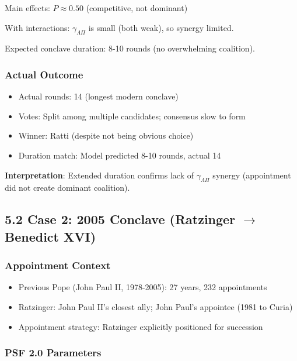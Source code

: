 \documentclass[11pt]{article}
\begin{document}
Main effects: $P \approx 0.50$ (competitive, not dominant)

With interactions: $\gamma_{\Lambda\Pi}$ is small (both weak), so synergy limited.

Expected conclave duration: 8-10 rounds (no overwhelming coalition).

\subsubsection{Actual Outcome}

\begin{itemize}
\item Actual rounds: 14 (longest modern conclave)
\item Votes: Split among multiple candidates; consensus slow to form
\item Winner: Ratti (despite not being obvious choice)
\item Duration match: Model predicted 8-10 rounds, actual 14
\end{itemize}

\textbf{Interpretation}: Extended duration confirms lack of $\gamma_{\Lambda\Pi}$ synergy (appointment did not create dominant coalition).

\subsection{5.2 Case 2: 2005 Conclave (Ratzinger $\to$ Benedict XVI)}

\subsubsection{Appointment Context}

\begin{itemize}
\item Previous Pope (John Paul II, 1978-2005): 27 years, 232 appointments
\item Ratzinger: John Paul II's closest ally; John Paul's appointee (1981 to Curia)
\item Appointment strategy: Ratzinger explicitly positioned for succession
\end{itemize}

\subsubsection{PSF 2.0 Parameters}
\end{document}
